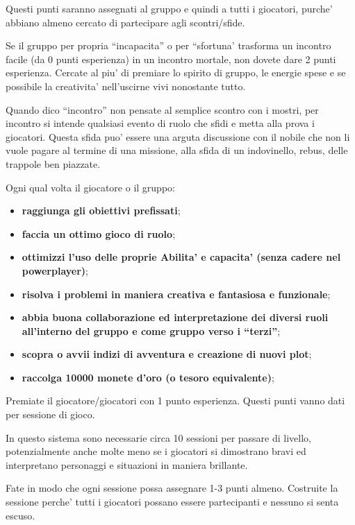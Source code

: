 \documentclass[a4paper,11pt,twoside,openany]{dndbook}
\begin{document}
Questi punti saranno assegnati al gruppo e quindi a tutti i giocatori, purche' abbiano almeno cercato di partecipare agli scontri/sfide.

Se il gruppo per propria ``incapacita'' o per ``sfortuna' trasforma un incontro facile (da 0 punti esperienza) in un incontro mortale, non dovete dare 2 punti esperienza. Cercate al piu' di premiare lo spirito di gruppo, le energie spese e se possibile la creativita' nell'uscirne vivi  nonostante tutto.

Quando dico ``incontro'' non pensate al semplice scontro con i mostri, per incontro si intende qualsiasi evento di ruolo che sfidi e metta alla prova i giocatori. Questa sfida puo' essere una arguta discussione con il nobile che non li vuole pagare al termine di una missione, alla sfida di un indovinello, rebus, delle trappole ben piazzate.

\bigskip

Ogni qual volta il giocatore o il gruppo:
\begin{itemize}
\item 
\textbf{raggiunga gli obiettivi prefissati}; 
\item 
\textbf{faccia un ottimo gioco di ruolo}; 
\item 
\textbf{ottimizzi l'uso delle proprie Abilita' e capacita' (senza cadere nel powerplayer)}; 
\item 
\textbf{risolva i problemi in maniera creativa e fantasiosa e funzionale}; 
\item 
\textbf{abbia buona collaborazione ed interpretazione dei diversi ruoli all'interno del gruppo e come gruppo verso i ``terzi''}; 
\item 
\textbf{scopra o avvii indizi di avventura e creazione di nuovi plot};
\item
\textbf{raccolga 10000 monete d'oro (o tesoro equivalente)};
\end{itemize}

\bigskip

Premiate il giocatore/giocatori con 1 punto esperienza. Questi punti vanno dati per sessione di gioco.

In questo sistema sono necessarie circa 10 sessioni per passare di livello, potenzialmente anche molte meno se i giocatori si dimostrano bravi ed interpretano personaggi e situazioni in maniera brillante. 

Fate in modo che ogni sessione possa assegnare 1-3 punti almeno. Costruite la sessione perche' tutti i giocatori possano essere partecipanti e nessuno si senta escuso.
\end{document}
